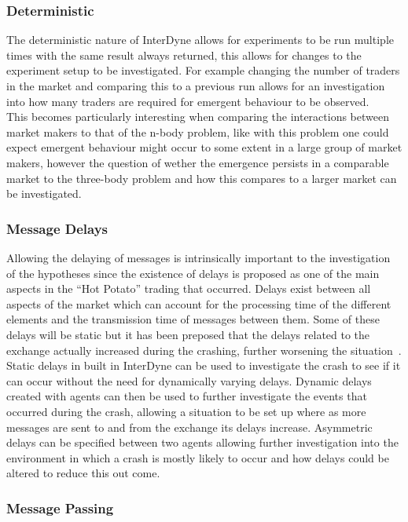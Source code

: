 \documentclass{article}
\begin{document}
\subsubsection{Deterministic}

The deterministic nature of InterDyne allows for experiments to be run multiple times with the same result always returned, this allows for changes to the experiment setup to be investigated. For example changing the number of traders in the market and comparing this to a previous run allows for an investigation into how many traders are required for emergent behaviour to be observed.\\
This becomes particularly interesting when comparing the interactions between market makers to that of the n-body problem, like with this problem one could expect emergent behaviour might occur to some extent in a large group of market makers, however the question of wether the emergence persists in a comparable market to the three-body problem and how this compares to a larger market can be investigated.   


\subsubsection{Message Delays}


Allowing the delaying of messages is intrinsically important to the investigation of the hypotheses since the existence of delays is proposed as one of the main aspects in the ``Hot Potato'' trading that occurred. Delays exist between all aspects of the market which can account for the processing time of the different elements and the transmission time of messages between them. Some of these delays will be static but it has been preposed that the delays related to the exchange actually increased during the crashing, further worsening the situation~\cite{SECreport_delays}.\\
Static delays in built in InterDyne can be used to investigate the crash to see if it can occur without the need for dynamically varying delays. Dynamic delays created with agents can then be used to further investigate the events that occurred during the crash, allowing a situation to be set up where as more messages are sent to and from the exchange its delays increase.  Asymmetric delays can be specified between two agents allowing further investigation into the environment in which a crash is mostly likely to occur and how delays could be altered to reduce this out come. 

\subsubsection{Message Passing}
\end{document}
